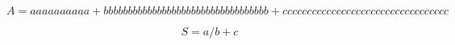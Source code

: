 \[
  A = aaaaaaaaaa
      + bbbbbbbbbbbbbbbbbbbbbbbbbbbbbbbbbb
      + cccccccccccccccccccccccccccccccccc
\]

\[
  S = a / b + c
\]
